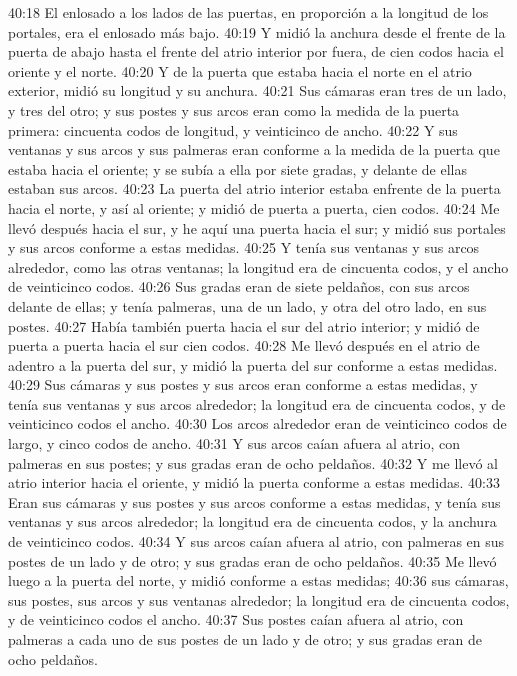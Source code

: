 40:18 El enlosado a los lados de las puertas, en proporción a la longitud de los portales, era el enlosado más bajo.   
40:19 Y midió la anchura desde el frente de la puerta de abajo hasta el frente del atrio interior por fuera, de cien codos   hacia el oriente y el norte.   
40:20 Y de la puerta que estaba hacia el norte en el atrio exterior, midió su longitud y su anchura.   
40:21 Sus cámaras eran tres de un lado, y tres del otro; y sus postes y sus arcos eran como la medida de la puerta primera: cincuenta codos   de longitud, y veinticinco de ancho.   
40:22 Y sus ventanas y sus arcos y sus palmeras eran conforme a la medida de la puerta que estaba hacia el oriente; y se subía a ella por siete gradas, y delante de ellas estaban sus arcos. 
40:23 La puerta del atrio interior estaba enfrente de la puerta hacia el norte, y así al oriente; y midió de puerta a puerta, cien codos. 
40:24 Me llevó después hacia el sur, y he aquí una puerta hacia el sur; y midió sus portales y sus arcos conforme a estas medidas.   
40:25 Y tenía sus ventanas y sus arcos alrededor, como las otras ventanas; la longitud era de cincuenta codos, y el ancho de veinticinco codos.   
40:26 Sus gradas eran de siete peldaños, con sus arcos delante de ellas; y tenía palmeras, una de un lado, y otra del otro lado, en sus postes.   
40:27 Había también puerta hacia el sur del atrio interior; y midió de puerta a puerta hacia el sur cien codos. 
40:28 Me llevó después en el atrio de adentro a la puerta del sur, y midió la puerta del sur conforme a estas medidas.   
40:29 Sus cámaras y sus postes y sus arcos eran conforme a estas medidas, y tenía sus ventanas y sus arcos alrededor; la longitud era de cincuenta codos, y de veinticinco codos el ancho.   
40:30 Los arcos alrededor eran de veinticinco codos   de largo, y cinco codos de ancho.   
40:31 Y sus arcos caían afuera al atrio, con palmeras en sus postes; y sus gradas eran de ocho peldaños.   
40:32 Y me llevó al atrio interior hacia el oriente, y midió la puerta conforme a estas medidas.   
40:33 Eran sus cámaras y sus postes y sus arcos conforme a estas medidas, y tenía sus ventanas y sus arcos alrededor; la longitud era de cincuenta codos, y la anchura de veinticinco codos.   
40:34 Y sus arcos caían afuera al atrio, con palmeras en sus postes de un lado y de otro; y sus gradas eran de ocho peldaños.   
40:35 Me llevó luego a la puerta del norte, y midió conforme a estas medidas;   
40:36 sus cámaras, sus postes, sus arcos y sus ventanas alrededor; la longitud era de cincuenta codos, y de veinticinco codos el ancho.   
40:37 Sus postes caían afuera al atrio, con palmeras a cada uno de sus postes de un lado y de otro; y sus gradas eran de ocho peldaños.   
